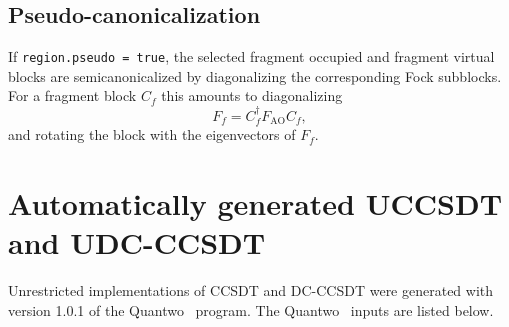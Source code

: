 \documentclass[a4paper,12pt,oneside]{book}
\newcommand{\quantwo}{\textsf{Quantwo} }
\newcommand{\cmd}[1]{\texttt{#1}}
\begin{document}
\section{Pseudo-canonicalization}

If \cmd{region.pseudo = true}, the selected fragment occupied and fragment virtual blocks are semicanonicalized by diagonalizing the corresponding Fock subblocks. For a fragment block $C_f$ this amounts to diagonalizing
\begin{equation}
  F_f = C_f^\dagger F_{\mathrm{AO}} C_f,
\end{equation}
and rotating the block with the eigenvectors of $F_f$.



\chapter{Automatically generated UCCSDT and UDC-CCSDT}
Unrestricted implementations of CCSDT and DC-CCSDT\cite{kats19_dc,rishi19,schraivogel21_dc} 
were generated with version 1.0.1 of the \quantwo\ program\cite{quantwo}.
The \quantwo\ inputs are listed below.
\end{document}
